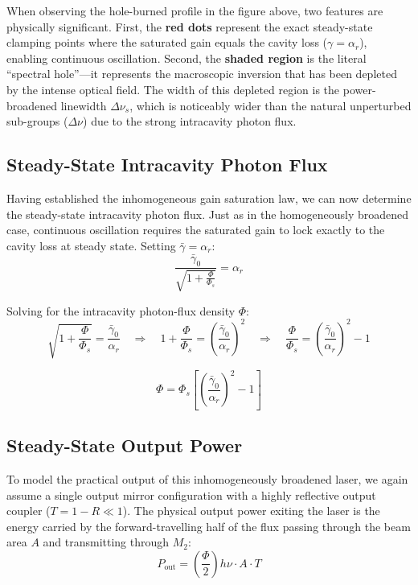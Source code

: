 When observing the hole-burned profile in the figure above, two features are physically significant. First, the \textbf{red dots} represent the exact steady-state clamping points where the saturated gain equals the cavity loss ($\gamma = \alpha_r$), enabling continuous oscillation. Second, the \textbf{shaded region} is the literal ``spectral hole''---it represents the macroscopic inversion that has been depleted by the intense optical field. The width of this depleted region is the power-broadened linewidth $\Delta\nu_s$, which is noticeably wider than the natural unperturbed sub-groups ($\Delta\nu$) due to the strong intracavity photon flux.

\subsection{Steady-State Intracavity Photon Flux}

Having established the inhomogeneous gain saturation law, we can now determine the steady-state intracavity photon flux. Just as in the homogeneously broadened case, continuous oscillation requires the saturated gain to lock exactly to the cavity loss at steady state. Setting $\bar{\gamma} = \alpha_r$:
\begin{equation*}
    \frac{\bar{\gamma}_0}{\sqrt{1 + \frac{\Phi}{\Phi_s}}} = \alpha_r
\end{equation*}

Solving for the intracavity photon-flux density $\Phi$:
\begin{equation*}
    \sqrt{1 + \frac{\Phi}{\Phi_s}} = \frac{\bar{\gamma}_0}{\alpha_r}
    \quad\Rightarrow\quad
    1 + \frac{\Phi}{\Phi_s} = \left(\frac{\bar{\gamma}_0}{\alpha_r}\right)^{\!2}
    \quad\Rightarrow\quad
    \frac{\Phi}{\Phi_s} = \left(\frac{\bar{\gamma}_0}{\alpha_r}\right)^{\!2} - 1
\end{equation*}

\begin{keyresult}
    \begin{equation}
        \Phi = \Phi_s \left[ \left(\frac{\bar{\gamma}_0}{\alpha_r}\right)^{\!2} - 1 \right]
    \end{equation}
\end{keyresult}

\subsection{Steady-State Output Power}

To model the practical output of this inhomogeneously broadened laser, we again assume a single output mirror configuration with a highly reflective output coupler ($T = 1 - R \ll 1$). The physical output power exiting the laser is the energy carried by the forward-travelling half of the flux passing through the beam area $A$ and transmitting through $M_2$:
\begin{equation*}
    P_{\text{out}} = \left(\frac{\Phi}{2}\right) h\nu\cdot A\cdot T
\end{equation*}

